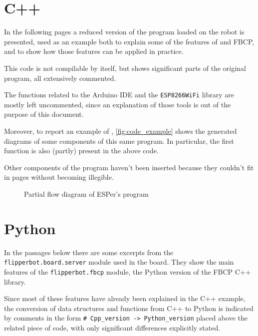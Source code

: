 \section{C++}
In the following pages a reduced version of the program loaded on the robot is presented,
used as an example both to explain some of the features of \ScheMo{} and FBCP,
and to show how those features can be applied in practice.

This code is not compilable by itself, but shows significant parts of the
original program, all extensively commented.

The functions related to the Arduino IDE and the \Verb|ESP8266WiFi| library are
mostly left uncommented, since an explanation of those tools is out of the
purpose of this document.



Moreover, to report an example of \ScheMoTeX{}, \autoref{fig:code_example} shows the
generated diagrams of some components of this same program. In particular,
the first function is also (partly) present in the above code.

Other components of the program haven't been inserted because they couldn't fit
in pages without becoming illegible.

\begin{figure}[hp]
  
  \caption{Partial flow diagram of ESPer's program}
  \label{fig:code_example}
\end{figure}

\section{Python}
In the passages below there are some excerpts from the \Verb|flipperbot.board.server| module
used in the board. They show the main features of the \Verb|flipperbot.fbcp|
module, the Python version of the FBCP C++ library.

Since most of these features have already been explained in the C++ example,
the conversion of data structures and functions from C++ to Python is indicated
by comments in the form \Verb|# Cpp_version -> Python_version| placed above the
related piece of code, with only significant differences explicitly stated.


